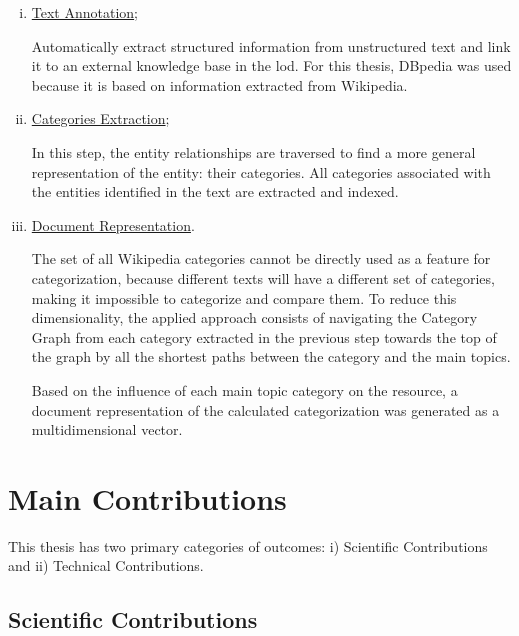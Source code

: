 \begin{enumerate}[(i)]
\item \hyperref[sec:text-annotation]{Text Annotation};

Automatically extract structured information from unstructured text and link it to an external knowledge base in the \gls{lod}. For this thesis, DBpedia was used because it is based on information extracted from Wikipedia.

\item \hyperref[sec:categories-extraction]{Categories Extraction};

In this step, the entity relationships are traversed to find a more general representation of the entity: their categories. All categories associated with the entities identified in the text are extracted and indexed.

\item \hyperref[sec:doc-representation]{Document Representation}.

The set of all Wikipedia categories cannot be directly used as a feature for categorization, because different texts will have a different set of categories, making it impossible to categorize and compare them. To reduce this dimensionality, the applied approach consists of navigating the Category Graph from each category extracted in the previous step towards the top of the graph by all the shortest paths between the category and the main topics. 

Based on the influence of each main topic category on the resource, a document representation of the calculated categorization was generated as a multidimensional vector.

\end{enumerate}

\section{\hspace*{3pt}Main Contributions}

This thesis has two primary categories of outcomes: i) Scientific Contributions and ii) Technical Contributions.

\subsection{\hspace*{3pt}Scientific Contributions}


